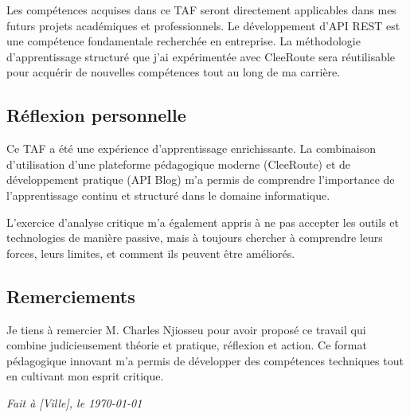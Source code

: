 \documentclass[12pt,a4paper]{article}
\begin{document}
Les compétences acquises dans ce TAF seront directement applicables dans mes futurs projets académiques et professionnels. Le développement d'API REST est une compétence fondamentale recherchée en entreprise. La méthodologie d'apprentissage structuré que j'ai expérimentée avec CleeRoute sera réutilisable pour acquérir de nouvelles compétences tout au long de ma carrière.

\subsection{Réflexion personnelle}

Ce TAF a été une expérience d'apprentissage enrichissante. La combinaison d'utilisation d'une plateforme pédagogique moderne (CleeRoute) et de développement pratique (API Blog) m'a permis de comprendre l'importance de l'apprentissage continu et structuré dans le domaine informatique.

L'exercice d'analyse critique m'a également appris à ne pas accepter les outils et technologies de manière passive, mais à toujours chercher à comprendre leurs forces, leurs limites, et comment ils peuvent être améliorés.

\subsection{Remerciements}

Je tiens à remercier M. Charles Njiosseu pour avoir proposé ce travail qui combine judicieusement théorie et pratique, réflexion et action. Ce format pédagogique innovant m'a permis de développer des compétences techniques tout en cultivant mon esprit critique.

\vspace{1cm}

\begin{flushright}
\textit{Fait à [Ville], le \today}
\end{flushright}
\end{document}
